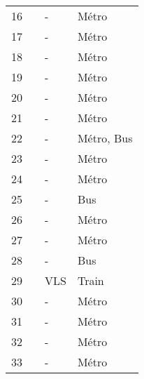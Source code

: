 \begin{longtable}{p{0.5cm}p{5.5cm}p{3cm}p{4cm}}
    \small{16} & \small{\textcite{li_integration_2020}}\index{Li, Jie|pagebf} & \small{-} & \small{Métro}\\
    \small{17} & \small{\textcite{li_unbalanced_2022}}\index{Li, Lili|pagebf} & \small{-} & \small{Métro}\\
    \small{18} & \small{\textcite{li_exploring_2021}}\index{Li, Wei|pagebf} & \small{-} & \small{Métro}\\
    \small{19} & \small{\textcite{li_factors_2020}}\index{Li, Xuefeng|pagebf} & \small{-} & \small{Métro}\\
    \small{20} & \small{\textcite{li_operating_2019}} & \small{-} & \small{Métro}\\
    \small{21} & \small{\textcite{lin_analysis_2019}}\index{Lin, Diao|pagebf} & \small{-} & \small{Métro}\\
    \small{22} & \small{\textcite{liu_mode_2022}}\index{Liu, Lumei|pagebf} & \small{-} & \small{Métro, Bus}\\
    \small{23} & \small{\textcite{liu_temporal_2022}}\index{Liu, Siyang|pagebf} & \small{-} & \small{Métro}\\
    \small{24} & \small{\textcite{liu_concordance_2022}}\index{Liu, Siyang|pagebf} & \small{-} & \small{Métro}\\
    \small{25} & \small{\textcite{ma_impacts_2019}}\index{Ma, Xiaolei|pagebf} & \small{-} & \small{Bus}\\
    \small{26} & \small{\textcite{ni_exploring_2020}}\index{Ni, Ying|pagebf} & \small{-} & \small{Métro}\\
    \small{27} & \small{\textcite{pan_reposition_2023}}\index{Pan, Xiaoyi|pagebf} & \small{-} & \small{Métro}\\
    \small{28} & \small{\textcite{qiu_interplay_2021}}\index{Qiu, Waishan|pagebf} & \small{-} & \small{Bus}\\
    \small{29} & \small{\textcite{van_der_nat_bicycle_2018}}\index{van der Nat, Johanna Debóra|pagebf} & \small{VLS} & \small{Train}\\
    \small{30} & \small{\textcite{wang_relationship_2020}}\index{Wang, Ruoyu|pagebf} & \small{-} & \small{Métro}\\
    \small{31} & \small{\textcite{wang_spatiotemporal_2020}}\index{Wang, Zijia|pagebf} & \small{-} & \small{Métro}\\
    \small{32} & \small{\textcite{wu_measuring_2019}}\index{Wu, Xueying|pagebf} & \small{-} & \small{Métro}\\
    \small{33} & \small{\textcite{yang_spatiotemporal_2019}}\index{Yang, Yuanxuan|pagebf} & \small{-} & \small{Métro}\\

\end{longtable}
